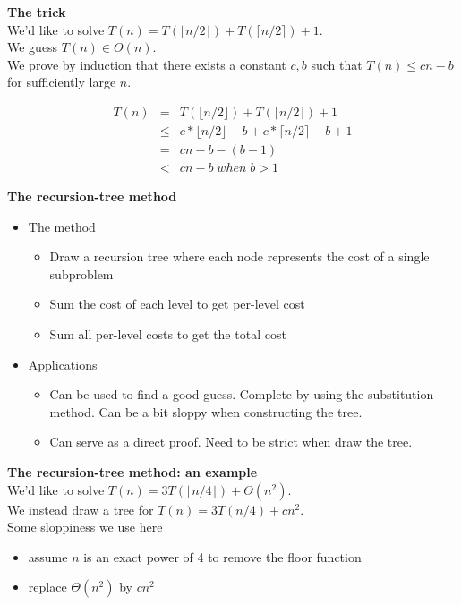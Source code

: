 \documentclass{seminar}
\begin{document}
\begin{slide}
{\bf The trick} \\
We'd like to solve $T(n)=T(\lfloor n/2 \rfloor)+ T(\lceil n/2 \rceil) + 1$. \\
We guess $T(n) \in O(n)$. \\
We  prove by induction that there exists a constant $c,b$ such that $T(n)
\le cn-b$ for sufficiently large $n$.

\begin{eqnarray*}
T(n) & = & T(\lfloor n/2 \rfloor)+ T(\lceil n/2 \rceil) + 1 \\
     & \le & c*\lfloor n/2 \rfloor-b + c*\lceil n/2 \rceil -b + 1\\
     & = & cn - b - (b-1)  \\
     & < & cn-b \; when \; b>1
\end{eqnarray*}
\end{slide}


\begin{slide}
{\bf The  recursion-tree method}
\begin{itemize}
\item The method
  \begin{itemize}
  \item Draw a recursion tree where each node represents the cost of a single
    subproblem
  \item Sum the cost of each level to get per-level cost
  \item Sum all per-level costs to get the total cost
  \end{itemize}

\item Applications
\begin{itemize}
\item Can be used to find a good guess. Complete by using the substitution
  method. Can be a bit sloppy when constructing the tree. 
\item Can serve as a direct proof. Need to be strict when draw the tree.
\end{itemize}
\end{itemize}
\end{slide}


\begin{slide}
{\bf The recursion-tree method: an example} \\
We'd like to solve $T(n)=3T(\lfloor n/4 \rfloor)+ \Theta(n^2)$. \\
We instead draw a tree for $T(n)=3T(n/4)+ cn^2$. \\
Some sloppiness we use here
\begin{itemize}
\item assume $n$ is an exact power of 4 to remove the floor function
\item replace $\Theta(n^2)$ by $cn^2$ 
\end{itemize}
\end{slide}
\end{document}
